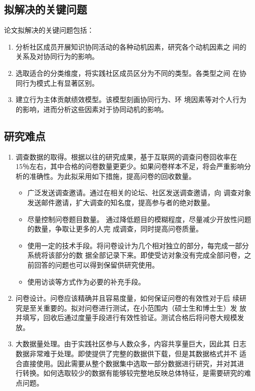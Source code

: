 \documentclass[12pt,a4paper,cs4size]{ctexart}
\begin{document}
\subsection{拟解决的关键问题 }
\label{sec:-}
论文拟解决的关键问题包括：
\begin{enumerate}
\item  分析社区成员开展知识协同活动的各种动机因素，研究各个动机因素之
  间的关系及对协同行为的影响。
\item  选取适合的分类维度，将实践社区成员区分为不同的类型。各类型之间
  在协同行为模式上有显著区别。
\item 建立行为主体贡献绩效模型。该模型刻画协同行为、环
  境因素等对个人行为的影响，进而分析这些因素对于协同动机的影响。
\end{enumerate}




\subsection{研究难点}
\begin{enumerate}
\item 调查数据的取得。根据以往的研究成果，基于互联网的调查问卷回收率在
  15％左右，其中合格的问卷数量更更少。如果问卷样本不足，将会严重影响分
  析的准确性。为此拟采用如下措施，提高问卷的回收数量。
  \begin{itemize}
  \item 广泛发送调查邀请。通过在相关的论坛、社区发送调查邀请，向
    调查对象发送邮件邀请，扩大调查的知名度，提高参与者的绝对数量。
   \item 尽量控制问卷题目数量。
    通过降低题目的模糊程度，尽量减少开放性问题的数量，争取让更多的人完
    成调查，同时提高问卷质量。
   \item 使用一定的技术手段。将问卷设计为几个相对独立的部分，每完成一部分系统将该部分的数
     据全部记录下来。即使受访对象没有完成全部问卷，之
     前回答的问题也可以得到保留供研究使用。
   \item 使用访谈等方式作为必要的补充手段。
  \end{itemize}

\item  问卷设计。问卷应该精确并且容易度量，如何保证问卷的有效性对于后
  续研究是至关重要的。拟对问卷进行测试，在小范围内（硕士生和博士生）发
  放并填写，回收后通过度量手段进行有效性验证。测试合格后将问卷大规模发
  放。
\item  大数据量处理。由于实践社区参与人数众多，内容共享量巨大，因此其
  日志数据非常难于处理。即使提供了完整的数据供下载，但是其数据格式并不
  适合直接使用。因此需要从整个数据集中选取一部分数据进行研究，并对其进
  行转换。如何选取较少的数据有能够较完整地反映总体特征，是需要研究的难
  点问题。
\end{enumerate}
\end{document}
